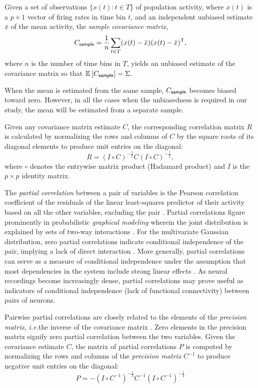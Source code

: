 {Given a set of observations $\{x(t): t\in T$\} of population activity, where $x(t)$ is a $p\times 1$ vector of firing rates in time bin $t$, and an independent unbiased estimate $\bar x$ of the mean activity, the \emph{sample covariance matrix},
\begin{equation}\label{eq:sample}
    C_{\sf sample} = \frac 1 n \sum\limits_{t\in T} (x(t)-\bar x)(x(t)-\bar x)^{\sf T},
    \end{equation}
where $n$ is the number of time bins in $T$, yields an unbiased estimate of the covariance matrix so that $\mathbb E_{}\left[ C_{\sf sample}\right]=\Sigma$.

When the mean is estimated from the same sample, $C_{\sf sample}$ becomes biased toward zero.  However, in all the cases when the unbiasedness is required in our study, the mean will be estimated from a separate sample.

Given any covariance matrix estimate $C$, the corresponding correlation matrix $R$ is calculated by normalizing the rows and columns of $C$ by the square roots of its diagonal elements to produce unit entries on the diagonal:
\begin{equation}\label{eq:precision}
    R = \left(I\circ C\right)^{-\frac 1 2} C \left(I\circ C\right)^{-\frac 1 2},
\end{equation}
where $\circ$ denotes the entrywise matrix product (Hadamard product) and $I$ is the $p\times p$ identity matrix.

The \emph{partial correlation} between a pair of variables is the Pearson correlation coefficient of the residuals of the linear least-squares predictor of their activity based on all the other variables, excluding the pair \cite{Anderson:2003, Whittaker:1990}. Partial correlations figure prominently in probabilistic \emph{graphical modeling} wherein the joint distribution is explained by sets of two-way interactions \cite{Whittaker:1990}. For the multivariate Gaussian distribution, zero partial correlations indicate conditional independence of the pair, implying a lack of direct interaction \cite{Dempster:1972, Whittaker:1990}. More generally, partial correlations can serve as a measure of conditional independence under the assumption that most dependencies in the system include strong linear effects \cite{Whittaker:1990,Baba:2004}. As neural recordings become increasingly dense, partial correlations may prove useful as indicators of conditional independence (lack of functional connectivity) between pairs of neurons.

Pairwise partial correlations are closely related to the elements of the \emph{precision matrix}, \emph{i.e.}\;the inverse of the covariance matrix \cite{Dempster:1972,Whittaker:1990}. Zero elements in the precision matrix signify zero partial correlation between the two variables. Given the covariance estimate $C$, the matrix of partial correlations $P$ is computed by normalizing the rows and columns of the \emph{precision matrix} $C^{-1}$ to produce negative unit entries on the diagonal:
\begin{equation}\label{eq:partial}
    P = -\left(I\circ C^{-1}\right)^{-\frac 1 2} C^{-1} \left(I\circ C^{-1}\right)^{-\frac 1 2}
\end{equation}

}
